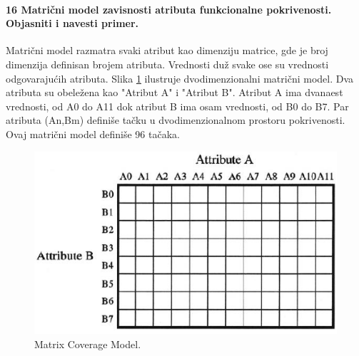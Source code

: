 \documentclass[a4paper, 12pt]{article}
\begin{document}
\paragraph{16 Matrični model zavisnosti atributa funkcionalne pokrivenosti. Objasniti i navesti primer.}
\hfill \break
\indent Matrični model razmatra svaki atribut kao dimenziju matrice, gde je broj dimenzija definisan brojem atributa. Vrednosti duž svake ose su vrednosti odgovarajućih atributa. Slika \ref{img-matrix-coverage-model} ilustruje dvodimenzionalni matrični model. Dva atributa su obeležena kao "Atribut A" i "Atribut B". Atribut A ima dvanaest vrednosti, od A0 do A11 dok atribut B ima osam vrednosti, od B0 do B7. Par atributa (An,Bm) definiše tačku u dvodimenzionalnom prostoru pokrivenosti. Ovaj matrični model definiše 96 tačaka.
\begin{figure}[h!]
\centering
\includegraphics[scale=0.5]{img-matrix-coverage-model.png}
\caption{Matrix Coverage Model.}
\label{img-matrix-coverage-model}
\end{figure}
\end{document}

